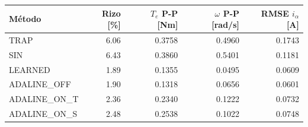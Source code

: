 \begin{tabular}{lrrrr}
\toprule
M\'etodo & Rizo [\%] & $T_e$ P-P [Nm] & $\omega$ P-P [rad/s] & RMSE $i_\alpha$ [A] \\
\midrule
TRAP & 6.06 & 0.3758 & 0.4960 & 0.1743 \\
SIN & 6.43 & 0.3860 & 0.5401 & 0.1181 \\
LEARNED & 1.89 & 0.1355 & 0.0495 & 0.0609 \\
ADALINE\_OFF & 1.90 & 0.1318 & 0.0656 & 0.0601 \\
ADALINE\_ON\_T & 2.36 & 0.2340 & 0.1222 & 0.0732 \\
ADALINE\_ON\_S & 2.48 & 0.2538 & 0.1022 & 0.0748 \\
\bottomrule
\end{tabular}
